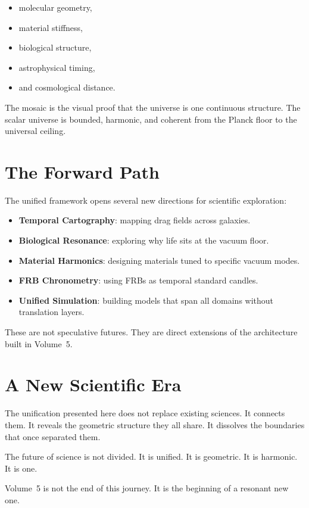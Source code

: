 \documentclass[11pt, letterpaper, openany]{book}
\begin{document}
\begin{itemize}
    \item molecular geometry,
    \item material stiffness,
    \item biological structure,
    \item astrophysical timing,
    \item and cosmological distance.
\end{itemize}

The mosaic is the visual proof that the universe is one continuous structure.  
The scalar universe is bounded, harmonic, and coherent from the Planck floor to the universal
ceiling.

\section*{The Forward Path}
The unified framework opens several new directions for scientific exploration:

\begin{itemize}
    \item \textbf{Temporal Cartography}: mapping drag fields across galaxies.
    \item \textbf{Biological Resonance}: exploring why life sits at the vacuum floor.
    \item \textbf{Material Harmonics}: designing materials tuned to specific vacuum modes.
    \item \textbf{FRB Chronometry}: using FRBs as temporal standard candles.
    \item \textbf{Unified Simulation}: building models that span all domains without translation layers.
\end{itemize}

These are not speculative futures.  
They are direct extensions of the architecture built in Volume~5.

\section*{A New Scientific Era}
The unification presented here does not replace existing sciences.  
It connects them.  
It reveals the geometric structure they all share.  
It dissolves the boundaries that once separated them.

The future of science is not divided.  
It is unified.  
It is geometric.  
It is harmonic.  
It is one.

Volume~5 is not the end of this journey.  
It is the beginning of a resonant new one.
\end{document}
